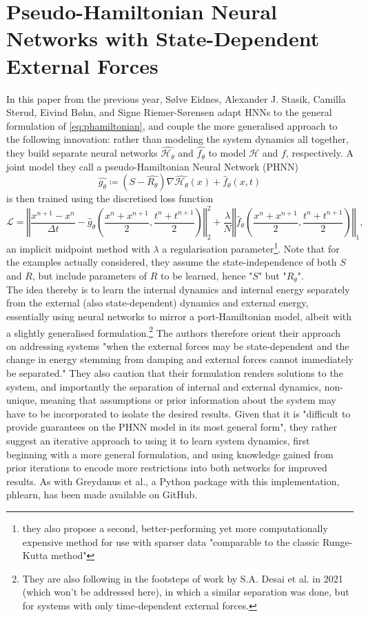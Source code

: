 \documentclass[10 pt, a4paper]{article}
\begin{document}
\section{Pseudo-Hamiltonian Neural Networks with State-Dependent External Forces}
In this paper from the previous year, Sølve Eidnes, Alexander J. Stasik, Camilla Sterud, Eivind Bøhn, and Signe Riemer-Sørensen adapt HNNs to the general formulation of \eqref{eq:phamiltonian}, and couple the more generalised approach to the following innovation: rather than modeling the system dynamics all together, they build separate neural networks $\hat{\mathcal{H}_\theta}$ and $\hat{f_\theta}$ to model $\mathcal{H}$ and $f$, respectively. A joint model they call a pseudo-Hamiltonian Neural Network (PHNN) \[\hat{g_\theta} \coloneqq (S-\hat{R_\theta})\nabla\hat{\mathcal{H}_\theta}(x) + \hat{f}_\theta(x,t)\] is then trained using the discretised loss function \[\mathcal{L}=\left\Vert \frac{x^{n+1}-x^n}{\Delta t} - \hat{g}_\theta \left(\frac{x^n + x^{n+1}}{2},\frac{t^n + t^{n+1}}{2}\right) \right\Vert_2^2 + \frac{\lambda}{N}\left\Vert \hat{f}_\theta \left(\frac{x^n + x^{n+1}}{2},\frac{t^n + t^{n+1}}{2}\right) \right\Vert_1,\] an implicit midpoint method with $\lambda$ a regularisation parameter\footnote{they also propose a second, better-performing yet more computationally expensive method for use with sparser data "comparable to the classic Runge-Kutta method"\cite{phnn}}. Note that for the examples actually considered, they assume the state-independence of both $S$ and $R$, but include parameters of $R$ to be learned, hence "$S$" but "$\hat{R}_\theta$".\\
The idea thereby is to learn the internal dynamics and internal energy separately from the external (also state-dependent) dynamics and external energy, essentially using neural networks to mirror a port-Hamiltonian model, albeit with a slightly generalised formulation.\footnote{They are also following in the footsteps of work by S.A. Desai et al. in 2021 (which won't be addressed here), in which a similar separation was done, but for systems with only time-dependent external forces.} The authors therefore orient their approach on addressing systems "when the external forces may be state-dependent and the change in energy stemming from damping and external forces cannot immediately be separated."\cite{phnn} They also caution that their formulation renders solutions to the system, and importantly the separation of internal and external dynamics, non-unique, meaning that assumptions or prior information about the system may have to be incorporated to isolate the desired results. Given that it is "difficult to provide guarantees on the PHNN model in its most general form"\cite{phnn}, they rather suggest an iterative approach to using it to learn system dynamics, first beginning with a more general formulation, and using knowledge gained from prior iterations to encode more restrictions into both networks for improved results. As with Greydanus et al., a Python package with this implementation, phlearn, has been made available on GitHub.
\end{document}
